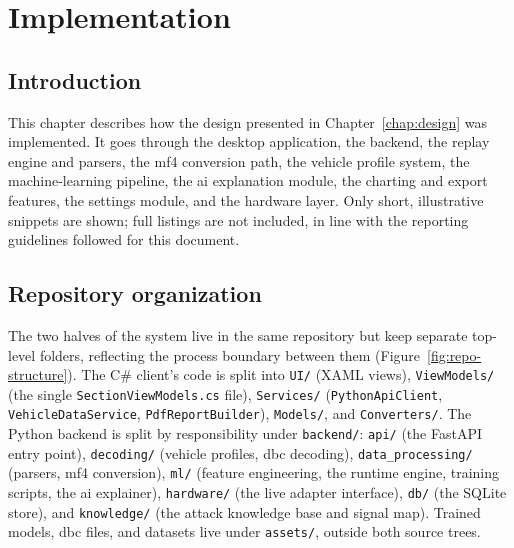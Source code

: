 \chapter{Implementation}
\label{chap:impl}

\section{Introduction}

This chapter describes how the design presented in Chapter~\ref{chap:design} was implemented. It goes through the desktop application, the backend, the replay engine and parsers, the \gls{mf4} conversion path, the vehicle profile system, the machine-learning pipeline, the \gls{ai} explanation module, the charting and export features, the settings module, and the hardware layer. Only short, illustrative snippets are shown; full listings are not included, in line with the reporting guidelines followed for this document.

\section{Repository organization}

The two halves of the system live in the same repository but keep separate top-level folders, reflecting the process boundary between them (Figure~\ref{fig:repo-structure}). The C\# client's code is split into \texttt{UI/} (XAML views), \texttt{ViewModels/} (the single \texttt{SectionViewModels.cs} file), \texttt{Services/} (\texttt{PythonApiClient}, \texttt{VehicleDataService}, \texttt{PdfReportBuilder}), \texttt{Models/}, and \texttt{Converters/}. The Python backend is split by responsibility under \texttt{backend/}: \texttt{api/} (the FastAPI entry point), \texttt{decoding/} (vehicle profiles, \gls{dbc} decoding), \texttt{data\_processing/} (parsers, \gls{mf4} conversion), \texttt{ml/} (feature engineering, the runtime engine, training scripts, the \gls{ai} explainer), \texttt{hardware/} (the live adapter interface), \texttt{db/} (the SQLite store), and \texttt{knowledge/} (the attack knowledge base and signal map). Trained models, \gls{dbc} files, and datasets live under \texttt{assets/}, outside both source trees.

